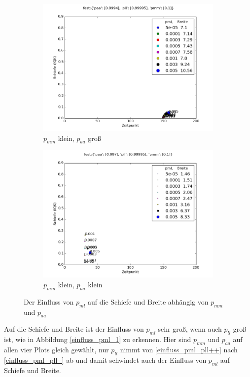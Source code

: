 \begin{figure}
\begin{subfigure}[b]{0.5\textwidth}
\includegraphics[width=\textwidth]{bilder/pml/pml_01_p_09994_099995}
\caption{$p_{mm}$ klein, $p_{aa}$ groß}
\end{subfigure}
\begin{subfigure}[b]{0.5\textwidth}
\includegraphics[width=\textwidth]{bilder/pml/pml_01_p_0997_099995}
\caption{$p_{mm}$ klein, $p_{aa}$ klein}
\end{subfigure}
\caption{Der Einfluss von $p_{ml}$ auf die Schiefe und Breite abhängig von $p_{mm}$ und $p_{aa}$}
\label{einfluss_pml_2}
\end{figure}

Auf die Schiefe und Breite ist der Einfluss von $p_{ml}$ sehr groß, wenn auch $p_{ll}$ groß ist, wie in Abbildung \ref{einfluss_pml_1} zu erkennen. Hier sind $p_{mm}$ und $p_{aa}$ auf allen vier Plots gleich gewählt, nur $p_{ll}$ nimmt von \ref{einfluss_pml_pll++} nach \ref{einfluss_pml_pll--} ab und damit schwindet auch der Einfluss von $p_{ml}$ auf Schiefe und Breite.

